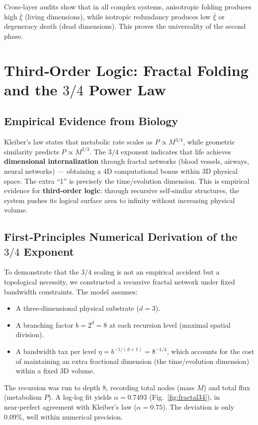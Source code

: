 \documentclass[12pt,a4paper]{article}
\begin{document}
Cross‑layer audits show that in all complex systems, anisotropic folding produces high $\bar{\xi}$ (living dimensions), while isotropic redundancy produces low $\bar{\xi}$ or degeneracy death (dead dimensions). This proves the universality of the second phase.

\section{Third‑Order Logic: Fractal Folding and the $3/4$ Power Law}

\subsection{Empirical Evidence from Biology}
Kleiber's law states that metabolic rate scales as $P \propto M^{3/4}$, while geometric similarity predicts $P \propto M^{2/3}$. The $3/4$ exponent indicates that life achieves \textbf{dimensional internalization} through fractal networks (blood vessels, airways, neural networks) — obtaining a 4D computational bonus within 3D physical space. The extra “1” is precisely the time/evolution dimension. This is empirical evidence for \textbf{third‑order logic}: through recursive self‑similar structures, the system pushes its logical surface area to infinity without increasing physical volume.

\subsection{First‑Principles Numerical Derivation of the $3/4$ Exponent}

To demonstrate that the $3/4$ scaling is not an empirical accident but a topological necessity, we constructed a recursive fractal network under fixed bandwidth constraints. The model assumes:
\begin{itemize}
    \item A three‑dimensional physical substrate ($d=3$).
    \item A branching factor $b = 2^d = 8$ at each recursion level (maximal spatial division).
    \item A bandwidth tax per level $\eta = b^{-1/(d+1)} = 8^{-1/4}$, which accounts for the cost of maintaining an extra fractional dimension (the time/evolution dimension) within a fixed 3D volume.
\end{itemize}
The recursion was run to depth 8, recording total nodes (mass $M$) and total flux (metabolism $P$). A log‑log fit yields $\alpha = 0.7493$ (Fig.~\ref{fig:fractal34}), in near‑perfect agreement with Kleiber’s law ($\alpha = 0.75$). The deviation is only $0.09\%$, well within numerical precision.
\end{document}
